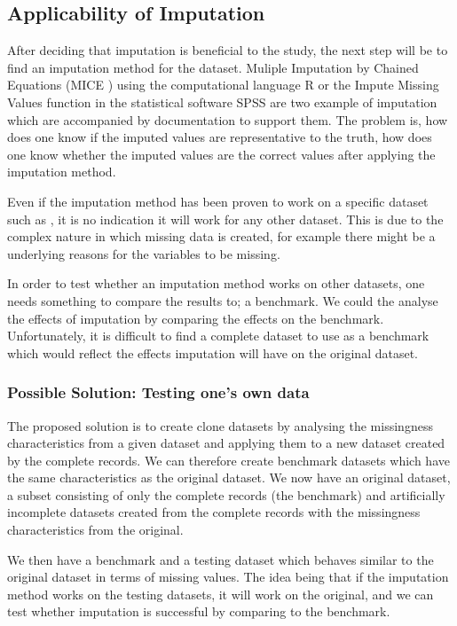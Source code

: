 \documentclass[conference,compsoc]{IEEEtran}
\begin{document}
		\subsection{Applicability of Imputation} %
		\label{sub:will_it_work_on_my_data}
			After deciding that imputation is beneficial to the study, the next step will be to find an imputation method for the dataset. Muliple Imputation by Chained Equations (MICE \cite{mice}) using the computational language R \cite{r} or the Impute Missing Values function in the statistical software SPSS \cite{spss} are two example of imputation which are accompanied by documentation to support them. The problem is, how does one know if the imputed values are representative to the truth, how does one know whether the imputed values are the correct values after applying the imputation method.

			Even if the imputation method has been proven to work on a specific dataset such as \cite{compare}, it is no indication it will work for any other dataset. This is due to the complex nature in which missing data is created, for example there might be a underlying reasons for the variables to be missing\cite{missing4,missing5}. 

			In order to test whether an imputation method works on other datasets, one needs something to compare the results to; a benchmark. We could the analyse the effects of imputation by comparing the effects on the benchmark. Unfortunately, it is difficult to find a complete dataset to use as a benchmark which would reflect the effects imputation will have on the original dataset.
			\subsubsection{Possible Solution: Testing one's own data} %
			\label{sub:possible_solution}
				The proposed solution is to create clone datasets by analysing the missingness characteristics from a given dataset and applying them to a new dataset created by the complete records. We can therefore create benchmark datasets which have the same characteristics as the original dataset. We now have an original dataset, a subset consisting of only the complete records (the benchmark) and artificially incomplete datasets created from the complete records with the missingness characteristics from the original. 

				We then have a benchmark and a testing dataset which behaves similar to the original dataset in terms of missing values. The idea being that if the imputation method works on the testing datasets, it will work on the original, and we can test whether imputation is successful by comparing to the benchmark. 
\end{document}
